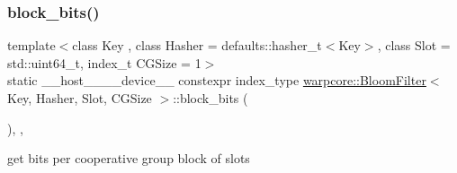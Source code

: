 \subsubsection{\texorpdfstring{block\+\_\+bits()}{block\_bits()}}
{\footnotesize\ttfamily template$<$class Key , class Hasher  = defaults\+::hasher\+\_\+t$<$\+Key$>$, class Slot  = std\+::uint64\+\_\+t, index\+\_\+t C\+G\+Size = 1$>$ \\
static \+\_\+\+\_\+host\+\_\+\+\_\+\+\_\+\+\_\+device\+\_\+\+\_\+ constexpr index\+\_\+type \hyperlink{classwarpcore_1_1BloomFilter}{warpcore\+::\+Bloom\+Filter}$<$ Key, Hasher, Slot, C\+G\+Size $>$\+::block\+\_\+bits (\begin{DoxyParamCaption}{ }\end{DoxyParamCaption})\hspace{0.3cm}{\ttfamily [inline]}, {\ttfamily [static]}, {\ttfamily [noexcept]}}



get bits per cooperative group block of slots 

